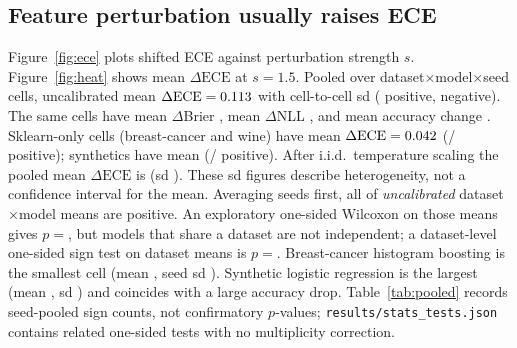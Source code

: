 \documentclass[10pt,twocolumn]{article}
\begin{document}
\subsection{Feature perturbation usually raises ECE}
Figure~\ref{fig:ece} plots shifted ECE against perturbation strength $s$.
Figure~\ref{fig:heat} shows mean $\Delta\mathrm{ECE}$ at $s{=}1.5$.
Pooled over \NumNoneN{} dataset$\times$model$\times$seed cells,
uncalibrated mean $\Delta\mathrm{ECE}=0.113$ with
cell-to-cell sd \NumNoneDeltaStd{}
(\NumNoneNPos{} positive, \NumNoneNNeg{} negative). The same cells have
mean $\Delta$Brier \NumNoneDeltaBrierMean, mean $\Delta$NLL
\NumNoneDeltaNllMean, and mean accuracy change \NumNoneDeltaAccMean.
Sklearn-only cells (breast-cancer and wine) have mean
$\Delta\mathrm{ECE}=0.042$
(\NumSklearnNPos/\NumSklearnN{} positive); synthetics have mean
\NumSynthDeltaMean{} (\NumSynthNPos/\NumSynthN{} positive). After i.i.d.\
temperature scaling the pooled mean $\Delta\mathrm{ECE}$ is
\NumTempDeltaMean{} (sd \NumTempDeltaStd). These sd figures describe
heterogeneity, not a confidence interval for the mean. Averaging seeds
first, all \NumTwelveMeanNPos{} of \NumTwelveMeanN{} \emph{uncalibrated}
dataset$\times$model means are positive. An exploratory one-sided
Wilcoxon on those \NumTwelveMeanN{} means gives
$p{=}$\NumTwelveMeanP, but models that share a dataset are not
independent; a dataset-level one-sided sign test on
\NumDatasetSignN{} dataset means is $p{=}$\NumDatasetSignP.
Breast-cancer histogram boosting is the smallest cell (mean
\NumBcHgbDelta, seed sd \NumBcHgbDeltaStd). Synthetic logistic
regression is the largest (mean \NumSynthLogregDelta, sd
\NumSynthLogregDeltaStd) and coincides with a large accuracy drop.
Table~\ref{tab:pooled} records seed-pooled sign counts, not confirmatory
$p$-values; \texttt{results/stats\_tests.json} contains \NumNTests{}
related one-sided tests with no multiplicity correction.
\end{document}
